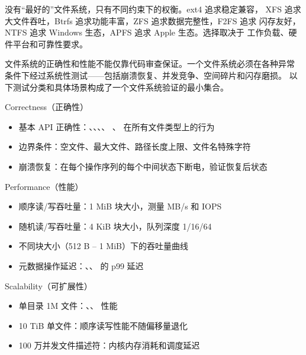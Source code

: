 \begin{filesystemlayout}
\begin{keyidea}
没有``最好的''文件系统，只有不同约束下的权衡。ext4 追求稳定兼容，
XFS 追求大文件吞吐，Btrfs 追求功能丰富，ZFS 追求数据完整性，F2FS 追求
闪存友好，NTFS 追求 Windows 生态，APFS 追求 Apple 生态。选择取决于
工作负载、硬件平台和可靠性要求。
\end{keyidea}


文件系统的正确性和性能不能仅靠代码审查保证。一个文件系统必须在各种异常
条件下经过系统性测试——包括崩溃恢复、并发竞争、空间碎片和闪存磨损。
以下测试分类和具体场景构成了一个文件系统验证的最小集合。


\begin{rubricbox}{Correctness（正确性）}
\begin{itemize}\tightlist
\item 基本 API 正确性：、、、、
      、 在所有文件类型上的行为
\item 边界条件：空文件、最大文件、路径长度上限、文件名特殊字符
\item 崩溃恢复：在每个操作序列的每个中间状态下断电，验证恢复后状态
\end{itemize}
\end{rubricbox}

\begin{rubricbox}{Performance（性能）}
\begin{itemize}\tightlist
\item 顺序读/写吞吐量：1 MiB 块大小，测量 MB/s 和 IOPS
\item 随机读/写吞吐量：4 KiB 块大小，队列深度 1/16/64
\item 不同块大小（512 B -- 1 MiB）下的吞吐量曲线
\item 元数据操作延迟：、、 的 p99 延迟
\end{itemize}
\end{rubricbox}

\begin{rubricbox}{Scalability（可扩展性）}
\begin{itemize}\tightlist
\item 单目录 1M 文件：、、 性能
\item 10 TiB 单文件：顺序读写性能不随偏移量退化
\item 100 万并发文件描述符：内核内存消耗和调度延迟
\end{itemize}
\end{rubricbox}


\end{filesystemlayout}
